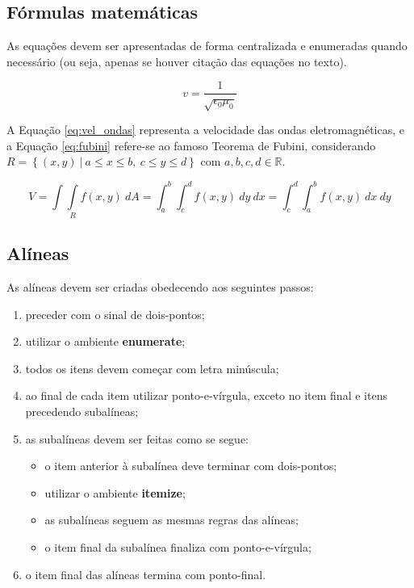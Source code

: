 \documentclass[artigo]{iftex2024}
\begin{document}
\subsection{Fórmulas matemáticas}

As equações devem ser apresentadas de forma centralizada e enumeradas quando necessário (ou seja, apenas se houver citação das equações no texto).

\begin{equation} \label{eq:vel_ondas}
 v=\frac{1}{\sqrt{\epsilon_0\mu_0}}
\end{equation}

A Equação \eqref{eq:vel_ondas} representa a velocidade das ondas eletromagnéticas, e a Equação \eqref{eq:fubini} refere-se ao famoso Teorema de Fubini, considerando $R=\left\{(x,y)~|~a\leq x\leq b,~c\leq y\leq d\right\}$ com $a,b,c,d\in\mathbb{R}$.

\begin{equation} \label{eq:fubini}
 V=\int\int\limits_R f(x,y)~dA=\int_a^b\int_c^d f(x,y)~dy~dx=\int_c^d\int_a^b f(x,y)~dx~dy
\end{equation}

\subsection{Alíneas}

As alíneas devem ser criadas obedecendo aos seguintes passos:
\begin{enumerate}
 \item preceder com o sinal de dois-pontos;
 \item utilizar o ambiente \textbf{enumerate};
 \item todos os itens devem começar com letra minúscula;
 \item ao final de cada item utilizar ponto-e-vírgula, exceto no item final e itens precedendo subalíneas;
 \item as subalíneas devem ser feitas como se segue:
 \begin{itemize}
  \item o item anterior à subalínea deve terminar com dois-pontos;
  \item utilizar o ambiente \textbf{itemize};
  \item as subalíneas seguem as mesmas regras das alíneas;
  \item o item final da subalínea finaliza com ponto-e-vírgula;
 \end{itemize}
 \item o item final das alíneas termina com ponto-final.
\end{enumerate}
\end{document}
